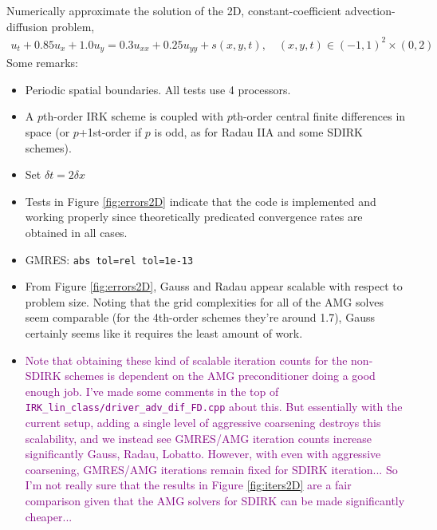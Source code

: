 \documentclass[review]{siamart}
\newcommand{\tcp}{\textcolor{purple}}
\begin{document}
Numerically approximate the solution of the 2D, constant-coefficient advection-diffusion problem,
\begin{align}
u_t + 0.85 u_x + 1.0 u_y = 0.3 u_{xx} + 0.25 u_{yy}  + s(x,y,t),
\quad (x,y,t) \in  (-1,1)^2 \times (0, 2)
\end{align}
Some remarks:
\begin{itemize}
\setlength\itemsep{0.5em}
\item Periodic spatial boundaries. All tests use 4 processors.

\item A $p$th-order IRK scheme is coupled with $p$th-order central finite differences in space (or $p$+1st-order if $p$ is odd, as for Radau IIA and some SDIRK schemes).

\item Set $\delta t = 2 \delta x$

\item Tests in Figure \ref{fig:errors2D} indicate that the code is implemented and working properly since theoretically predicated convergence rates are obtained in all cases.

\item GMRES: \texttt{abs tol=rel tol=1e-13}

\item From Figure \ref{fig:errors2D}, Gauss and Radau appear scalable with respect to problem size. Noting that the grid complexities for all of the AMG solves seem comparable (for the 4th-order schemes they're around 1.7), Gauss certainly seems like it requires the least amount of work.

\item \tcp{Note that obtaining these kind of scalable iteration counts for the non-SDIRK schemes is dependent on the AMG preconditioner doing a good enough job. I've made some comments in the top of \texttt{IRK\_lin\_class/driver\_adv\_dif\_FD.cpp} about this. But essentially with the current setup, adding a single level of aggressive coarsening destroys this scalability, and we instead see GMRES/AMG iteration counts increase significantly Gauss, Radau, Lobatto. However, with even with aggressive coarsening, GMRES/AMG iterations remain fixed for SDIRK iteration... So I'm not really sure that the results in Figure \ref{fig:iters2D} are a fair comparison given that the  AMG solvers for SDIRK can be made significantly cheaper...}

\end{itemize}
\end{document}
